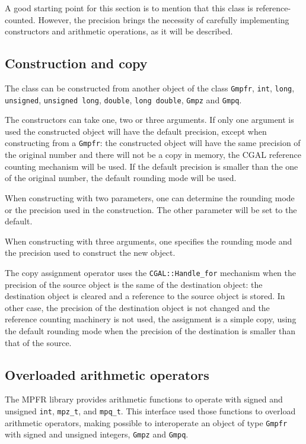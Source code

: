A good starting point for this section is to mention that this class is
reference-counted.
However, the precision brings the necessity of carefully implementing
constructors and arithmetic operations, as it will be described.


\subsection{Construction and copy}

The class can be constructed from another object of the class \verb=Gmpfr=,
\verb=int=, \verb=long=, \verb=unsigned=, \verb=unsigned long=, \verb=double=,
\verb=long double=, \verb=Gmpz= and \verb=Gmpq=.

The constructors can take one, two or three arguments.
If only one argument is used the constructed object will have the default
precision, except when constructing from a \verb=Gmpfr=: the constructed
object will have the same precision of the original number and there will
not be a copy in memory, the CGAL reference counting mechanism will be used.
If the default precision is smaller than the one of the original number, the
default rounding mode will be used.

When constructing with two parameters, one can determine the rounding mode or
the precision used in the construction.
The other parameter will be set to the default.

When constructing with three arguments, one specifies the rounding mode and
the precision used to construct the new object.

The copy assignment operator uses the \verb=CGAL::Handle_for= mechanism
when the precision of the source object is the same of the destination
object: the destination object is cleared and a reference to the source
object is stored. In other case, the precision of the destination object is
not changed and the reference counting machinery is not used, the
assignment is a simple copy, using the default rounding mode when the
precision of the destination is smaller than that of the source.


\subsection{Overloaded arithmetic operators}

The MPFR library provides arithmetic functions to operate with signed and
unsigned \verb=int=, \verb=mpz_t=, and \verb=mpq_t=.
This interface used those functions to overload arithmetic operators, making
possible to interoperate an object of type \verb=Gmpfr= with signed and
unsigned integers, \verb=Gmpz= and \verb=Gmpq=.


